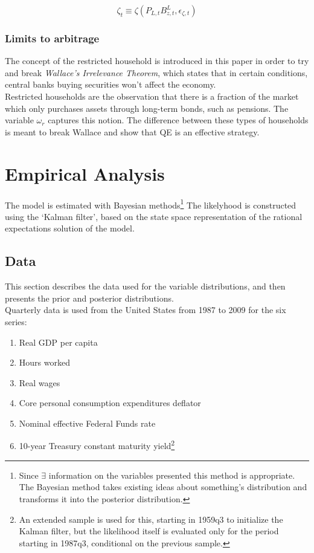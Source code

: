 \documentclass[notitlepage,12pt]{report}
\begin{document}
\begin{appendices}
	\begin{equation}
	\zeta_t\equiv\zeta(P_{L,t}B_{z,t}^L,\epsilon_{\zeta,t})
	\end{equation}
	
	\subsubsection{Limits to arbitrage}
	
	The concept of the restricted household is introduced in this paper in order to try and break {\it Wallace's Irrelevance Theorem}, which states that in certain conditions, central banks buying securities won't affect the economy.\cite{wallace_modigliani-miller_1981}\\
	Restricted households are the observation that there is a fraction of the market which only purchases assets through long-term bonds, such as pensions. The variable \(\omega_r\) captures this notion. The difference between these types of households is meant to break Wallace and show that QE is an effective strategy.
	
	\section{Empirical Analysis}
	
	The model is estimated with Bayesian methods\footnote{Since $\exists$ information on the variables presented this method is appropriate. The Bayesian method takes existing ideas about something's distribution and transforms it into the posterior distribution.} The likelyhood is constructed using the `Kalman filter', based on the state space representation of the rational expectations solution of the model.
	
	\subsection{Data}
	
	This section describes the data used for the variable distributions, and then presents the prior and posterior distributions.\\
	
	Quarterly data is used from the United States from 1987 to 2009 for the six series:
	
	\begin{enumerate}[noitemsep]
		\item Real GDP per capita
		\item Hours worked
		\item Real wages
		\item Core personal consumption expenditures deflator
		\item Nominal effective Federal Funds rate
		\item 10-year Treasury constant maturity yield\footnote{An extended sample is used for this, starting in 1959q3 to initialize the Kalman filter, but the likelihood itself is evaluated only for the period starting in 1987q3, conditional on the previous sample.}
	\end{enumerate}
	

\end{appendices}
\end{document}
